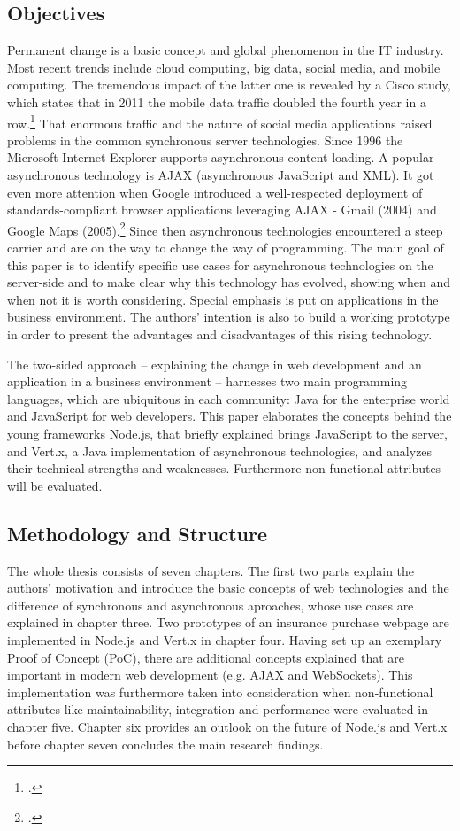 \subsection{Objectives}
\label{sec:objectives}
Permanent change is a basic concept and global phenomenon in the IT industry. 
Most recent trends include cloud computing, big data, social media, and mobile computing.
The tremendous impact of the latter one is  revealed by a Cisco study, which states that in 2011 the mobile data traffic
doubled the fourth year in a row.\footcite[Cf.]{cisco_2012} That enormous traffic and the
nature of social media applications raised problems in the common synchronous server technologies.
Since 1996 the Microsoft Internet Explorer supports asynchronous content loading. A popular
asynchronous technology is AJAX (asynchronous JavaScript and XML). It got even more attention when
Google introduced a well-respected deployment of standards-compliant browser applications leveraging AJAX - Gmail (2004) 
and Google Maps (2005).\footcite[Cf.]{Swartz_2005} Since then asynchronous technologies
encountered a steep carrier and are on the way to change the way of programming.
The main goal of this paper is to identify specific use cases for asynchronous technologies on the server-side and to make clear why this technology has evolved, showing when and when not it is worth considering. Special emphasis is put on applications in the business environment. 
The authors' intention is also to build a working prototype in order to present the advantages and
disadvantages of this rising technology.

The two-sided approach – explaining the change in web development and an application in a 
business environment – harnesses two main programming languages, which are ubiquitous in each
community: Java for the enterprise world and JavaScript for web developers.
This paper elaborates the concepts behind the young frameworks Node.js, that briefly explained brings JavaScript to the server, and 
Vert.x, a Java implementation of asynchronous technologies, and analyzes their 
technical strengths and weaknesses. Furthermore non-functional attributes will be
evaluated.

\subsection{Methodology and Structure}
The whole thesis consists of seven chapters. The first two parts explain the authors' motivation and introduce the 
basic concepts of web technologies and the difference of synchronous and asynchronous aproaches, whose use cases are explained in chapter three.
Two prototypes of an insurance purchase webpage are implemented in Node.js and Vert.x in chapter four.
Having set up an exemplary Proof of Concept (PoC), there are additional concepts explained that are important in modern web development (e.g. AJAX and WebSockets). This implementation was furthermore taken into consideration when non-functional attributes like maintainability, integration and performance were evaluated in chapter five. Chapter six provides an outlook on the future of Node.js and Vert.x before chapter seven concludes the main research findings.


